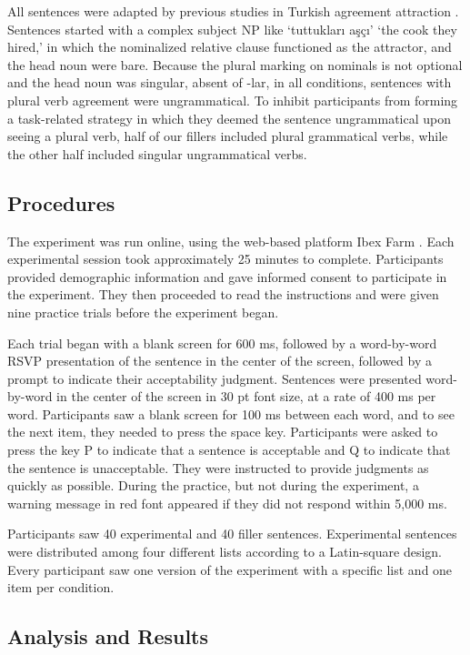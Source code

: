 \documentclass[
  authoryear,
  preprint]{elsarticle}
\begin{document}
All sentences were adapted by previous studies in Turkish agreement
attraction \citep{LagoEtAl2019, TurkLogacev2020}. Sentences started with
a complex subject NP like `tuttukları aşçı' `the cook they hired,' in
which the nominalized relative clause functioned as the attractor, and
the head noun were bare. Because the plural marking on nominals is not
optional and the head noun was singular, absent of -lar, in all
conditions, sentences with plural verb agreement were ungrammatical. To
inhibit participants from forming a task-related strategy in which they
deemed the sentence ungrammatical upon seeing a plural verb, half of our
fillers included plural grammatical verbs, while the other half included
singular ungrammatical verbs.

\subsection{Procedures}\label{procedures}

The experiment was run online, using the web-based platform Ibex Farm
\citep{Drummond2013}. Each experimental session took approximately 25
minutes to complete. Participants provided demographic information and
gave informed consent to participate in the experiment. They then
proceeded to read the instructions and were given nine practice trials
before the experiment began.

Each trial began with a blank screen for 600 ms, followed by a
word-by-word RSVP presentation of the sentence in the center of the
screen, followed by a prompt to indicate their acceptability judgment.
Sentences were presented word-by-word in the center of the screen in 30
pt font size, at a rate of 400 ms per word. Participants saw a blank
screen for 100 ms between each word, and to see the next item, they
needed to press the space key. Participants were asked to press the key
P to indicate that a sentence is acceptable and Q to indicate that the
sentence is unacceptable. They were instructed to provide judgments as
quickly as possible. During the practice, but not during the experiment,
a warning message in red font appeared if they did not respond within
5,000 ms.

Participants saw 40 experimental and 40 filler sentences. Experimental
sentences were distributed among four different lists according to a
Latin-square design. Every participant saw one version of the experiment
with a specific list and one item per condition.

\subsection{Analysis and Results}\label{analysis-and-results}
\end{document}

